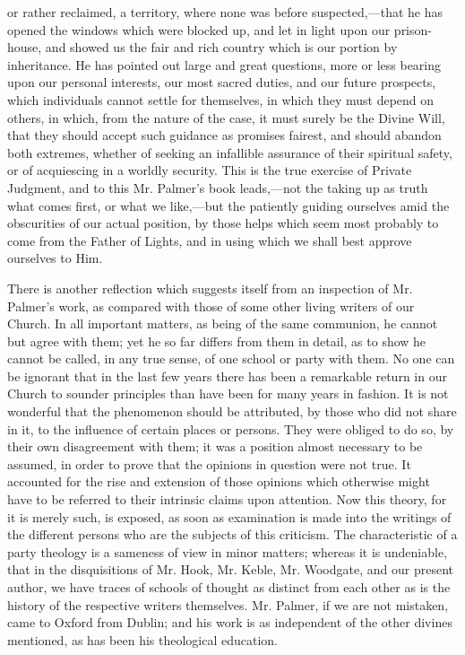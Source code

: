 or rather reclaimed, a territory, where none was before
suspected,—that he has opened the windows which were blocked up, and
let in light upon our prison-house, and showed us the fair and rich
country which is our portion by inheritance. He has pointed out large
and great questions, more or less bearing upon our personal
interests, our most sacred duties, and our future prospects, which
individuals cannot settle for themselves, in which they must depend on
others, in which, from the nature of the case, it must surely be the
Divine Will, that they should accept such guidance as promises
fairest, and should abandon both extremes, whether of seeking an
infallible assurance of their spiritual safety, or of acquiescing in a
worldly security. This is the true exercise of Private Judgment, and
to this Mr. Palmer's book leads,—not the taking up as truth what
comes first, or what we like,—but the patiently guiding ourselves
amid the obscurities of our actual position, by those helps which seem
most probably to come from the Father of Lights, and in using which we
shall best approve ourselves to Him.

There is another reflection which suggests itself
from an inspection of Mr. Palmer's work, as compared with those of
some other living writers of our Church. In all important matters, as
being of the same communion, he cannot but agree with them; yet he so
far differs from them in detail, as to show he cannot be called, in
any true sense, of one school or party with them. No one can be
ignorant that in the last few years there has been a remarkable return
in our Church to sounder principles than have been for many years in
fashion. It is not wonderful that the phenomenon should be attributed,
by those who did not share in it, to the influence of certain places
or persons. They were obliged to do so, by their own disagreement with
them; it was a position almost necessary to be assumed, in order to
prove that the opinions in question were not true. It accounted for
the rise and extension of those opinions which otherwise might have to
be referred to their intrinsic claims upon attention. Now this theory,
for it is merely such, is exposed, as soon as examination is
made into the writings of the different persons who are the subjects
of this criticism. The characteristic of a party theology is a
sameness of view in minor matters; whereas it is undeniable, that in
the disquisitions of Mr. Hook, Mr. Keble, Mr. Woodgate, and our
present author, we have traces of schools of thought as distinct from
each other as is the history of the respective writers themselves. Mr.
Palmer, if we are not mistaken, came to Oxford from Dublin; and his
work is as independent of the other divines mentioned, as has been his
theological education.

